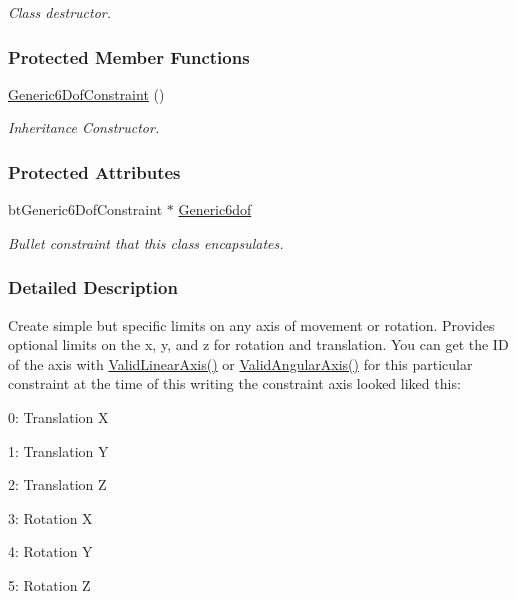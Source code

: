 \begin{DoxyCompactItemize}
\begin{DoxyCompactList}\small\item\em Class destructor. \item\end{DoxyCompactList}\end{DoxyCompactItemize}
\subsubsection*{Protected Member Functions}
\begin{DoxyCompactItemize}
\item 
\hyperlink{classMezzanine_1_1Generic6DofConstraint_ab950948993dc96cc088d94197f35a40d}{Generic6DofConstraint} ()
\begin{DoxyCompactList}\small\item\em Inheritance Constructor. \item\end{DoxyCompactList}\end{DoxyCompactItemize}
\subsubsection*{Protected Attributes}
\begin{DoxyCompactItemize}
\item 
\hypertarget{classMezzanine_1_1Generic6DofConstraint_abb10648cdb6987566223724d20de0b51}{
btGeneric6DofConstraint $\ast$ \hyperlink{classMezzanine_1_1Generic6DofConstraint_abb10648cdb6987566223724d20de0b51}{Generic6dof}}
\label{classMezzanine_1_1Generic6DofConstraint_abb10648cdb6987566223724d20de0b51}

\begin{DoxyCompactList}\small\item\em Bullet constraint that this class encapsulates. \item\end{DoxyCompactList}\end{DoxyCompactItemize}


\subsubsection{Detailed Description}
Create simple but specific limits on any axis of movement or rotation. Provides optional limits on the x, y, and z for rotation and translation. You can get the ID of the axis with \hyperlink{classMezzanine_1_1Generic6DofConstraint_a94db83422c1984cdbe1745662715ac9d}{ValidLinearAxis()} or \hyperlink{classMezzanine_1_1Generic6DofConstraint_a8a908f5f3857262db217a7f2dfc25c61}{ValidAngularAxis()} for this particular constraint at the time of this writing the constraint axis looked liked this:
\begin{DoxyItemize}
\item 0: Translation X
\item 1: Translation Y
\item 2: Translation Z
\item 3: Rotation X
\item 4: Rotation Y
\item 5: Rotation Z
\end{DoxyItemize}

